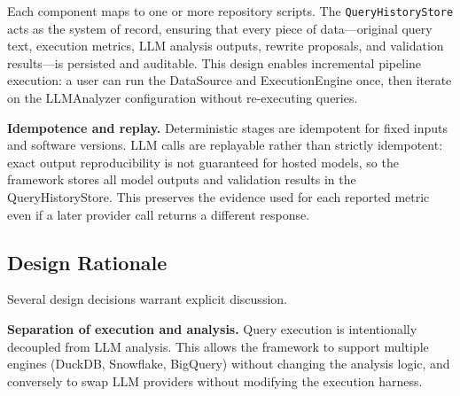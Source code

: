 \documentclass[conference]{IEEEtran}
\begin{document}
\begin{table}[t]
\caption{Architectural Components and Their Database Interactions}
\label{tab:components}
\centering
\small
{}
\end{table}

Each component maps to one or more repository scripts. The \texttt{QueryHistoryStore} acts as the system of record, ensuring that every piece of data---original query text, execution metrics, LLM analysis outputs, rewrite proposals, and validation results---is persisted and auditable. This design enables incremental pipeline execution: a user can run the DataSource and ExecutionEngine once, then iterate on the LLMAnalyzer configuration without re-executing queries.

\textbf{Idempotence and replay.} Deterministic stages are idempotent for fixed inputs and software versions. LLM calls are replayable rather than strictly idempotent: exact output reproducibility is not guaranteed for hosted models, so the framework stores all model outputs and validation results in the QueryHistoryStore. This preserves the evidence used for each reported metric even if a later provider call returns a different response.

\subsection{Design Rationale}
Several design decisions warrant explicit discussion.

\textbf{Separation of execution and analysis.} Query execution is intentionally decoupled from LLM analysis. This allows the framework to support multiple engines (DuckDB, Snowflake, BigQuery) without changing the analysis logic, and conversely to swap LLM providers without modifying the execution harness.
\end{document}
